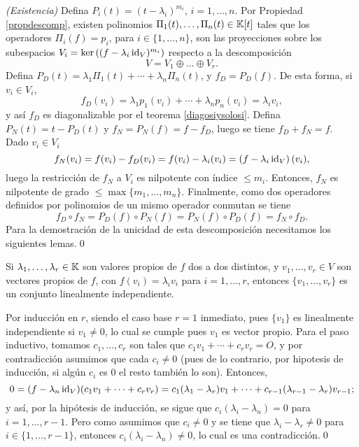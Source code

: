   \dem \emph{(Existencia)} Defina $P_i(t)=(t-\lambda_i)^{m_i}$, $i=1,\ldots,n$. Por Propiedad \ref{propdescomp}, existen polinomios $\Pi_1(t),\ldots,\Pi_n(t)\in \mathbb{K}[t]$ tales que los operadores $\Pi_i(f)=p_i$, para $i\in\{1,\ldots,n\}$, son las proyecciones sobre los subespacios $V_i=\ker\left((f-\lambda_i\operatorname{id}_V)^{m_i}\right)$ respecto a la descomposici\'on 
  \[
  V=V_1\oplus \ldots \oplus V_r.
  \]
  Defina $P_D(t)=\lambda_1\Pi_1(t)+\cdots+\lambda_n\Pi_n(t)$, y $f_D=P_D(f)$. De esta forma, si $v_i\in V_i$,
  \[
  f_D(v_i)=\lambda_1p_1(v_i)+\cdots+\lambda_np_n(v_i)=\lambda_iv_i,
  \]
  y as\'i $f_D$ es diagonalizable por el teorema \ref{diagosiysolosi}. Defina $P_N(t)=t-P_D(t)$ y $f_N=P_N(f)=f-f_D$, luego se tiene $f_D+f_N=f$. Dado $v_i\in V_i$
  \[
  f_N(v_i)=f(v_i)-f_D(v_i)=f(v_i)-\lambda_i(v_i)=\left(f-\lambda_i\operatorname{id}_V\right)(v_i),
  \]
  luego la restricci\'on de $f_N$ a $V_i$ es nilpotente con índice $\le m_i$. Entonces, $f_N$ es nilpotente de grado $\le\max\{m_1,\ldots,m_n\}$. Finalmente, como dos operadores definidos por polinomios de un mismo operador conmutan se tiene
  \[
  f_D\circ f_N=P_D(f)\circ P_N(f)=P_N(f)\circ P_D(f)=f_N\circ f_D.
  \]
  Para la demostración de la unicidad de esta descomposición necesitamos los siguientes lemas.\qed

\begin{lema}
Si $\lambda_1,\ldots,\lambda_r\in \mathbb{K}$ son valores propios de $f$ dos a dos distintos, y $v_1,\ldots,v_r\in V$ son vectores propios de $f$, con $f(v_i)=\lambda_iv_i$ para $i=1,\ldots,r$, entonces $\{v_1,\ldots,v_r\}$ es un conjunto linealmente independiente. 
\end{lema}

\dem Por inducci\'on en $r$, siendo el caso base $r=1$ inmediato, pues $\{v_1\}$ es linealmente independiente si $v_1\ne 0$, lo cual se cumple pues $v_1$ es vector propio. Para el paso inductivo, tomamos $c_1,\ldots,c_r$ son tales que $c_1v_1+\cdots+c_rv_r=O$, y por contradicci\'on asumimos que cada $c_i\ne 0$ (pues de lo contrario, por hipotesis de inducci\'on, si alg\'un $c_i$ es $0$ el resto tambi\'en lo son). Entonces,
\[
0=(f-\lambda_n\operatorname{id}_V)(c_1v_1+\cdots+c_rv_r)=c_1(\lambda_1-\lambda_r)v_1+\cdots+c_{r-1}(\lambda_{r-1}-\lambda_r)v_{r-1};
\]
y as\'i, por la hip\'otesis de inducci\'on, se sigue que $c_i(\lambda_i-\lambda_n)=0$ para $i=1,\ldots,r-1$. Pero como asumimos que $c_i\ne 0$ y se tiene que $\lambda_i-\lambda_r\ne 0$ para $i\in\{1,\ldots,r-1\}$, entonces $c_i(\lambda_i-\lambda_n)\ne 0$, lo cual es una contradicci\'on.\qed

